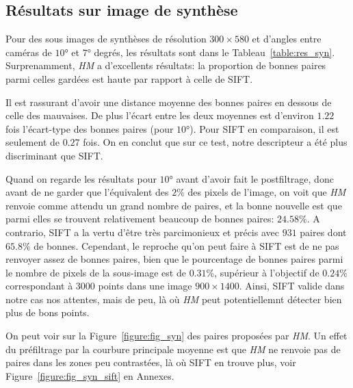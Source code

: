 \documentclass[
	a4paper, %
	10pt, %
	unnumberedsections, %
	twoside, %
]{LTJournalArticle}
\begin{document}
\subsection{Résultats sur image de synthèse}

Pour des sous images de synthèses de résolution $300 \times 580$ et
d'angles entre caméras de $10$° et $7$° degrés, les résultats sont dans le Tableau~\ref{table:res_syn}.
Surprenamment, \textit{HM} a d'excellents résultats: la proportion de bonnes paires parmi celles gardées
est haute par rapport à celle de SIFT.

Il est rassurant d'avoir une distance moyenne des bonnes paires en dessous de celle des mauvaises.
De plus l'écart entre les deux moyennes est d'environ $1.22$ fois l'écart-type des bonnes paires (pour $10$°). Pour SIFT en comparaison,
il est seulement de $0.27$ fois.
On en conclut que sur ce test, notre descripteur a été plus discriminant que SIFT.

Quand on regarde les résultats pour $10$° avant d'avoir fait le postfiltrage, donc avant de ne garder que l'équivalent des $2\%$ des pixels de l'image,
on voit que \textit{HM} renvoie comme attendu un grand nombre de paires, et la bonne nouvelle est que parmi elles se trouvent relativement beaucoup
de bonnes paires: $24.58\%$. A contrario, SIFT a la vertu d'être très parcimonieux et précis avec $931$ paires dont $65.8\%$ de bonnes.
Cependant, le reproche qu'on peut faire à SIFT est de ne pas renvoyer assez de bonnes paires, bien que le pourcentage de bonnes paires
parmi le nombre de pixels de la sous-image est de $0.31\%$, supérieur à l'objectif de $0.24\%$ correspondant à 3000 points dans une
image $900 \times 1400$. Ainsi, SIFT valide dans notre cas nos attentes, mais de peu, là où \textit{HM} peut potentiellemnt détecter bien
plus de bons points.

On peut voir sur la Figure~\ref{figure:fig_syn} des paires proposées par \textit{HM}.
Un effet du préfiltrage par la courbure principale moyenne est que \textit{HM} ne renvoie pas
de paires dans les zones peu contrastées, là où SIFT en trouve plus, voir Figure~\ref{figure:fig_syn_sift}
en Annexes.
\end{document}

